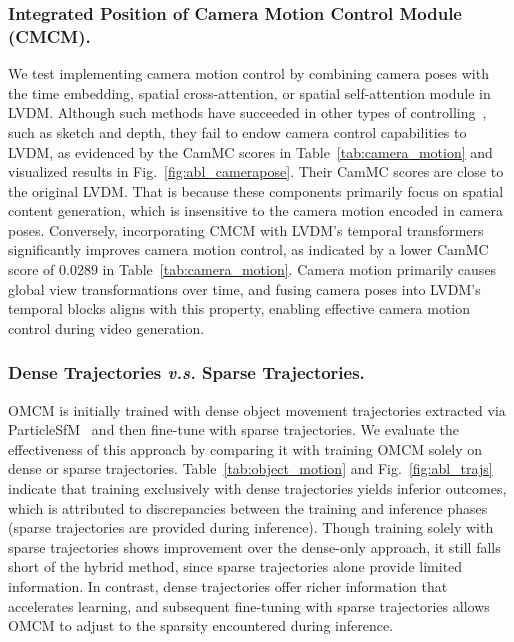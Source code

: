 \documentclass[sigconf]{acmart}
\begin{document}
\subsubsection{Integrated Position of Camera Motion Control Module (CMCM).}
We test implementing camera motion control by combining camera poses with the time embedding, spatial cross-attention, or spatial self-attention module in LVDM. Although such methods have succeeded in other types of controlling~\cite{ControlNet,mou2024t2i}, such as sketch and depth, they fail to endow camera control capabilities to LVDM, as evidenced by the CamMC scores in Table~\ref{tab:camera_motion} and visualized results in Fig.~\ref{fig:abl_camerapose}. Their CamMC scores are close to the original LVDM.
That is because these components primarily focus on spatial content generation, which is insensitive to the camera motion encoded in camera poses.
%
Conversely, incorporating CMCM with LVDM's temporal transformers significantly improves camera motion control, as indicated by a lower CamMC score of $0.0289$ in Table~\ref{tab:camera_motion}. Camera motion primarily causes global view transformations over time, and fusing camera poses into LVDM's temporal blocks aligns with this property, enabling effective camera motion control during video generation. 



\subsubsection{Dense Trajectories \textit{v.s.} Sparse Trajectories.} 
OMCM is initially trained with dense object movement trajectories extracted via ParticleSfM~\cite{zhao2022particlesfm} and then fine-tune with sparse trajectories.
We evaluate the effectiveness of this approach by comparing it with training OMCM solely on dense or sparse trajectories. Table~\ref{tab:object_motion} and Fig.~\ref{fig:abl_trajs} indicate that training exclusively with dense trajectories yields inferior outcomes, which is attributed to discrepancies between the training and inference phases (sparse trajectories are provided during inference).
%
Though training solely with sparse trajectories shows improvement over the dense-only approach, it still falls short of the hybrid method, since sparse trajectories alone provide limited information. In contrast, dense trajectories offer richer information that accelerates learning, and subsequent fine-tuning with sparse trajectories allows OMCM to adjust to the sparsity encountered during inference. 
\end{document}
